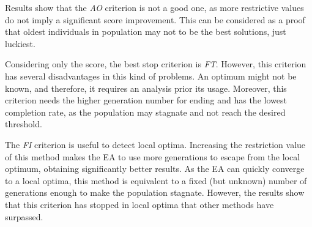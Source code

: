 \documentclass[runningheads,a4paper]{llncs}
\begin{document}

Results show that the \textit{AO} criterion is not a good one, as more restrictive values do not imply a significant score improvement. This can be considered as a proof that oldest individuals in population may not to be the best solutions, just luckiest.


Considering only the score, the best stop criterion is \textit{FT}. However, this criterion has several disadvantages in this kind of problems. An optimum might not be known, and therefore, it requires an analysis prior its usage. Moreover, this criterion needs the higher generation number for ending and has the lowest completion rate, as the population may stagnate and not reach the desired threshold. 

The \textit{FI} criterion is useful to detect local optima. Increasing the restriction value of this method makes the EA to use more generations to escape from the local optimum, obtaining significantly better results. As the EA can quickly converge to a local optima, this method is equivalent to a fixed (but unknown) number of generations enough to make the population stagnate. However, the results show that this criterion has stopped in local optima that other methods have surpassed.
\end{document}
